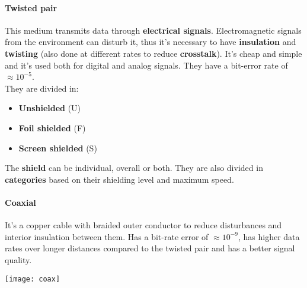 \paragraph{Twisted pair} This medium transmits data through \textbf{electrical signals}. Electromagnetic signals from the environment can disturb it, thus it's necessary to have \textbf{insulation} and \textbf{twisting} (also done at different rates to reduce \textbf{crosstalk}). It's cheap and simple and it's used both for digital and analog signals. They have a bit-error rate of $\approx 10^{-5}$.\\
They are divided in:
\begin{itemize}
	\item \textbf{Unshielded} (U)
	\item \textbf{Foil shielded} (F)
	\item \textbf{Screen shielded} (S)
\end{itemize}
The \textbf{shield} can be individual, overall or both. They are also divided in \textbf{categories} based on their shielding level and maximum speed.
\paragraph{Coaxial}
It's a copper cable with braided outer conductor to reduce disturbances and interior insulation between them. Has a bit-rate error of $\approx 10^{-9}$, has higher data rates over longer distances compared to the twisted pair and has a better signal quality.
\begin{center}
	\texttt{[image: coax]}
\end{center}


